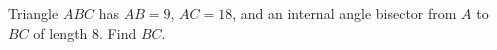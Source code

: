 Triangle $ABC$ has $AB=9$, $AC=18$, and an internal angle bisector from $A$ to $BC$ of length $8$. Find $BC$.
